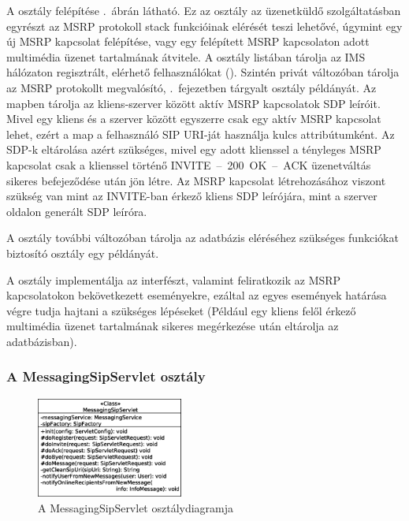 A  osztály felépítése .~ábrán látható. Ez az osztály az üzenetküldő szolgáltatásban egyrészt az MSRP protokoll stack funkcióinak elérését teszi lehetővé, úgymint egy új MSRP kapcsolat felépítése, vagy egy felépített MSRP kapcsolaton adott multimédia üzenet tartalmának átvitele. A  osztály listában tárolja az IMS hálózaton regisztrált, elérhető felhasználókat (). Szintén privát változóban tárolja az MSRP protokollt megvalósító, .~fejezetben tárgyalt  osztály példányát. Az  mapben tárolja az kliens-szerver között aktív MSRP kapcsolatok SDP leíróit. Mivel egy kliens és a szerver között egyszerre csak egy aktív MSRP kapcsolat lehet, ezért a map a felhasználó SIP URI-ját használja kulcs attribútumként. Az SDP-k eltárolása azért szükséges, mivel egy adott klienssel a tényleges MSRP kapcsolat csak a klienssel történő INVITE~--~200~OK~--~ACK üzenetváltás sikeres befejeződése után jön létre. Az MSRP kapcsolat létrehozásához viszont szükség van mint az INVITE-ban érkező kliens SDP leírójára, mint a szerver oldalon generált SDP leíróra.

A  osztály további változóban tárolja az adatbázis eléréséhez szükséges funkciókat biztosító  osztály egy példányát. 

A  osztály implementálja az  interfészt, valamint feliratkozik az MSRP kapcsolatokon bekövetkezett eseményekre, ezáltal az egyes események határása végre tudja hajtani a szükséges lépéseket (Például egy kliens felől érkező multimédia üzenet tartalmának sikeres megérkezése után eltárolja az adatbázisban).

\subsubsection*{A MessagingSipServlet osztály}
\label{sec:server_messagingsipservlet}

\begin{figure}
  \vspace{-60pt}
  \begin{center}
    \includegraphics[width=0.43\textwidth]{img/class_diagrams/server/eps/MessagingSipServlet.eps}
  \end{center}
  \vspace{-15pt}
  \captionsetup{font=scriptsize}
  \caption{A MessagingSipServlet osztálydiagramja}
   \label{fig:class_server_messagingsipservlet}
  \vspace{-10pt}
\end{figure}

